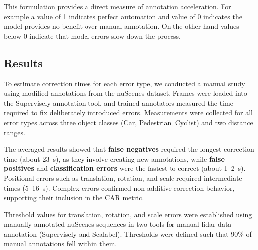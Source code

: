 \documentclass[conference]{IEEEtran}
\begin{document}
This formulation provides a direct measure of annotation acceleration. For example a value of 1 indicates perfect automation and value of 0 indicates the model provides no benefit over manual annotation. On the other hand values below 0 indicate that model errors slow down the process.

\subsection{Results}

To estimate correction times for each error type, we conducted a manual study using modified annotations from the nuScenes dataset. Frames were loaded into the Supervisely annotation tool, and trained annotators measured the time required to fix deliberately introduced errors. Measurements were collected for all error types across three object classes (Car, Pedestrian, Cyclist) and two distance ranges.

The averaged results showed that \textbf{false negatives} required the longest correction time (about 23~s), as they involve creating new annotations, while \textbf{false positives} and \textbf{classification errors} were the fastest to correct (about 1–2~s). Positional errors such as translation, rotation, and scale required intermediate times (5–16~s). Complex errors confirmed non-additive correction behavior, supporting their inclusion in the CAR metric.

Threshold values for translation, rotation, and scale errors were established using manually annotated nuScenes sequences in two tools for manual lidar data annotation (Supervisely and Scalabel).  Thresholds were defined such that 90\% of manual annotations fell within them.


\end{document}
